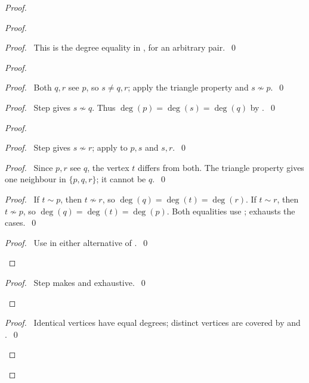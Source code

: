 \begin{proof}
 \begin{proof}
  \begin{proof}\pf\ This is the degree equality in , for an arbitrary pair.~\qed\end{proof}
  \begin{proof}
   \begin{proof}
    \pf\ Both $q,r$ see $p$, so $s\ne q,r$; apply the triangle property and $s\not\sim p$.~\qed
   \end{proof}
   \begin{proof}
    \pf\ Step  gives $s\not\sim q$. Thus
    $\deg(p)=\deg(s)=\deg(q)$ by .~\qed
   \end{proof}
   \begin{proof}
    \begin{proof}
     \pf\ Step  gives $s\not\sim r$;
     apply  to $p,s$ and $s,r$.~\qed
    \end{proof}
    \begin{proof}\pf\ Since $p,r$ see $q$, the vertex $t$ differs from both. The triangle property gives one neighbour in $\{p,q,r\}$; it cannot be $q$.~\qed\end{proof}
    \begin{proof}
     \pf\ If $t\sim p$, then $t\not\sim r$, so $\deg(q)=\deg(t)=\deg(r)$.
     If $t\sim r$, then $t\not\sim p$, so $\deg(q)=\deg(t)=\deg(p)$.
     Both equalities use ;  exhausts the cases.~\qed
    \end{proof}
    \qedstep
    \begin{proof}\pf\ Use  in either alternative of .~\qed\end{proof}
   \end{proof}
   \qedstep
   \begin{proof}\pf\ Step  makes  and  exhaustive.~\qed\end{proof}
  \end{proof}
  \qedstep
  \begin{proof}
   \pf\ Identical vertices have equal degrees; distinct vertices are covered by
    and .~\qed
  \end{proof}
 \end{proof}


\end{proof}

